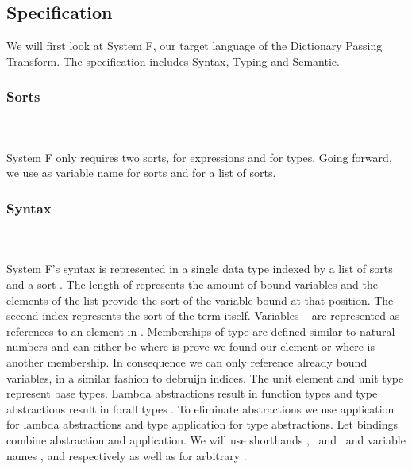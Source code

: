 \subsection{Specification}
We will first look at System F, our target language of the Dictionary Passing Transform. 
The specification includes Syntax, Typing and Semantic. 

\subsubsection{Sorts}\hfill\\\\
System F only requires two sorts,  for expressions and  for types. 
\FSort
Going forward, we use  as variable name for sorts and  for a list of sorts.

\subsubsection{Syntax}\hfill\\\\
System F's syntax is represented in a single data type  indexed by a list of sorts  and a sort . 
The length of  represents the amount of bound variables and the elements  of the list provide the sort of the variable bound at that position. 
The second index  represents the sort of the term itself.
\FTerm
Variables \  are represented as references    to an element in .
Memberships of type    are defined similar to natural numbers and can either be  where  is prove we found our element or   where  is another membership. 
In consequence we can only reference already bound variables, in a similar fashion to debruijn indices. 
The unit element  and unit type  represent base types. Lambda abstractions   result in function types    and type abstractions   result in forall types  . 
To eliminate abstractions we use application    for lambda abstractions and type application    for type abstractions. 
Let bindings  combine abstraction and application. 
We will use shorthands \FVar, \FExpr\ and \FType\ and variable names ,  and  respectively as well as  for arbitrary   .

